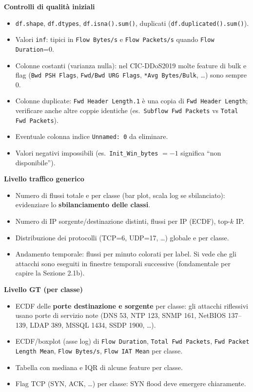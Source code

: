 \begin{strategia}
\textbf{Controlli di qualità iniziali}
\begin{itemize}
  \item \texttt{df.shape}, \texttt{df.dtypes}, \texttt{df.isna().sum()},
        duplicati (\texttt{df.duplicated().sum()}).
  \item Valori \texttt{inf}: tipici in \texttt{Flow Bytes/s} e
        \texttt{Flow Packets/s} quando \texttt{Flow Duration}=0.
  \item Colonne costanti (varianza nulla): nel CIC-DDoS2019 molte feature di
        bulk e flag (\texttt{Bwd PSH Flags}, \texttt{Fwd/Bwd URG Flags},
        \texttt{*Avg Bytes/Bulk}, \dots) sono sempre 0.
  \item Colonne duplicate: \texttt{Fwd Header Length.1} è una copia di
        \texttt{Fwd Header Length}; verificare anche altre coppie identiche
        (es.\ \texttt{Subflow Fwd Packets} vs \texttt{Total Fwd Packets}).
  \item Eventuale colonna indice \texttt{Unnamed: 0} da eliminare.
  \item Valori negativi impossibili (es.\ \texttt{Init\_Win\_bytes} $=-1$
        significa ``non disponibile'').
\end{itemize}

\textbf{Livello traffico generico}
\begin{itemize}
  \item Numero di flussi totale e per classe (bar plot, scala log se
        sbilanciato): evidenziare lo \textbf{sbilanciamento delle classi}.
  \item Numero di IP sorgente/destinazione distinti, flussi per IP
        (ECDF), top-$k$ IP.
  \item Distribuzione dei protocolli (TCP=6, UDP=17, \dots) globale e per classe.
  \item Andamento temporale: flussi per minuto colorati per label. Si vede
        che gli attacchi sono eseguiti in finestre temporali successive
        (fondamentale per capire la Sezione 2.1b).
\end{itemize}

\textbf{Livello GT (per classe)}
\begin{itemize}
  \item ECDF delle \textbf{porte destinazione e sorgente} per classe: gli
        attacchi riflessivi usano porte di servizio note (DNS 53, NTP 123,
        SNMP 161, NetBIOS 137--139, LDAP 389, MSSQL 1434, SSDP 1900, \dots).
  \item ECDF/boxplot (asse log) di \texttt{Flow Duration}, \texttt{Total Fwd
        Packets}, \texttt{Fwd Packet Length Mean}, \texttt{Flow Bytes/s},
        \texttt{Flow IAT Mean} per classe.
  \item Tabella con mediana e IQR di alcune feature per classe.
  \item Flag TCP (SYN, ACK, \dots) per classe: SYN flood deve emergere
        chiaramente.
\end{itemize}
\end{strategia}

